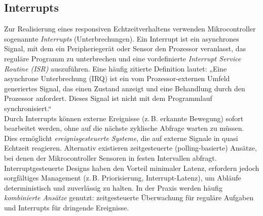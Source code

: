 \subsection*{Interrupts}
Zur Realisierung eines responsiven Echtzeitverhaltens verwenden Mikrocontroller sogenannte \emph{Interrupts} (Unterbrechungen). Ein Interrupt ist ein asynchrones Signal, mit dem ein Peripheriegerät oder Sensor den Prozessor veranlasst, das reguläre Programm zu unterbrechen und eine vordefinierte \emph{Interrupt Service Routine (ISR)} auszuführen. Eine häufig zitierte Definition lautet: „Eine asynchrone Unterbrechung (IRQ) ist ein vom Prozessor-externen Umfeld generiertes Signal, das einen Zustand anzeigt und eine Behandlung durch den Prozessor anfordert. Dieses Signal ist nicht mit dem Programmlauf synchronisiert.“ \autocite{echtzeit_grundlagen}
\\
Durch Interrupts können externe Ereignisse (z.\,B. erkannte Bewegung) sofort bearbeitet werden, ohne auf die nächste zyklische Abfrage warten zu müssen. Dies ermöglicht \emph{ereignisgesteuerte Systeme}, die auf externe Signale in quasi Echtzeit reagieren. Alternativ existieren zeitgesteuerte (polling-basierte) Ansätze, bei denen der Mikrocontroller Sensoren in festen Intervallen abfragt. Interruptgesteuerte Designs haben den Vorteil minimaler Latenz, erfordern jedoch sorgfältiges Management (z.\,B. Priorisierung, Interrupt-Latenz), um Abläufe deterministisch und zuverlässig zu halten. In der Praxis werden häufig \emph{kombinierte Ansätze} genutzt: zeitgesteuerte Überwachung für reguläre Aufgaben und Interrupts für dringende Ereignisse.

